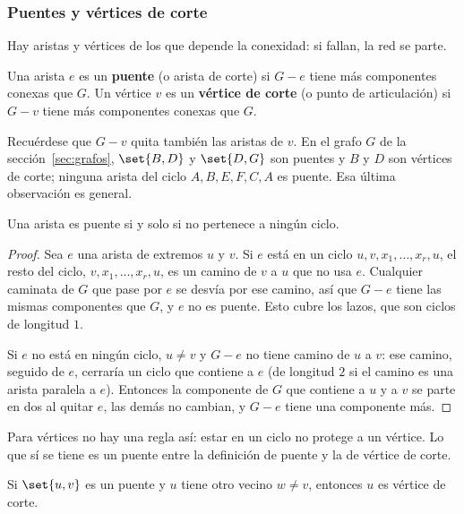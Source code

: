 \documentclass[11pt,letterpaper]{article}
\begin{document}
\subsubsection*{Puentes y vértices de corte}

Hay aristas y vértices de los que depende la conexidad: si fallan, la
red se parte.

\begin{definicion}
  \label{def:puente-corte}
  Una arista $e$ es un \textbf{puente} (o arista de corte) si $G - e$
  tiene más componentes conexas que $G$. Un vértice $v$ es un
  \textbf{vértice de corte} (o punto de articulación) si $G - v$ tiene
  más componentes conexas que $G$.
\end{definicion}

Recuérdese que $G - v$ quita también las aristas de $v$. En el grafo
$G$ de la sección~\ref{sec:grafos}, $\set{B, D}$ y $\set{D, G}$ son
puentes y $B$ y $D$ son vértices de corte; ninguna arista del ciclo
$A, B, E, F, C, A$ es puente. Esa última observación es general.

\begin{teorema}
  \label{teo:puente-ciclo}
  Una arista es puente si y solo si no pertenece a ningún ciclo.
\end{teorema}

\begin{proof}
  Sea $e$ una arista de extremos $u$ y $v$. Si $e$ está en un ciclo
  $u, v, x_1, \dots, x_r, u$, el resto del ciclo,
  $v, x_1, \dots, x_r, u$, es un camino de $v$ a $u$ que no usa $e$.
  Cualquier caminata de $G$ que pase por $e$ se desvía por ese camino,
  así que $G - e$ tiene las mismas componentes que $G$, y $e$ no es
  puente. Esto cubre los lazos, que son ciclos de longitud $1$.

  Si $e$ no está en ningún ciclo, $u \neq v$ y $G - e$ no tiene camino
  de $u$ a $v$: ese camino, seguido de $e$, cerraría un ciclo que
  contiene a $e$ (de longitud $2$ si el camino es una arista paralela a
  $e$). Entonces la componente de $G$ que contiene a $u$ y a $v$ se
  parte en dos al quitar $e$, las demás no cambian, y $G - e$ tiene una
  componente más.
\end{proof}

Para vértices no hay una regla así: estar en un ciclo no protege a un
vértice. Lo que sí se tiene es un puente entre la definición de puente
y la de vértice de corte.

\begin{corolario}
  \label{cor:puente-corte}
  Si $\set{u, v}$ es un puente y $u$ tiene otro vecino $w \neq v$,
  entonces $u$ es vértice de corte.
\end{corolario}
\end{document}
